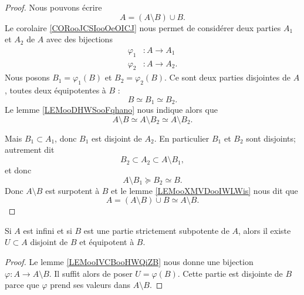 \begin{proof}
    Nous pouvons écrire
    \begin{equation}
        A=(A\setminus B)\cup B.
    \end{equation}
    Le corolaire \ref{CORooJCSIooOeOICJ} nous permet de considérer deux parties \( A_1\) et \( A_2\) de \( A\) avec des bijections
    \begin{subequations}
        \begin{align}
            \varphi_1&\colon A\to A_1\\
            \varphi_2&\colon A\to A_2.
        \end{align}
    \end{subequations}
    Nous posons \( B_1=\varphi_1(B)\) et \( B_2=\varphi_2(B)\). Ce sont deux parties disjointes de \( A\), toutes deux équipotentes à \( B\) :
    \begin{equation}
        B\simeq B_1\simeq B_2.
    \end{equation}
    Le lemme \ref{LEMooDHWSooFqhano} nous indique alors que
    \begin{equation}
        A\setminus B\simeq A\setminus B_2\simeq A\setminus B_2.
    \end{equation}
    
    Mais \( B_1\subset A_1\), donc \( B_1\) est disjoint de \( A_2\). En particulier \( B_1\) et \( B_2\) sont disjoints; autrement dit
    \begin{equation}
        B_2\subset A_2\subset A\setminus B_1,
    \end{equation}
    et donc
    \begin{equation}
         A\setminus B_1\succeq B_2\simeq B.
    \end{equation}
    Donc \( A\setminus B\) est surpotent à \( B\) et le lemme \ref{LEMooXMVDooIWLWis} nous dit que
    \begin{equation}
        A=(A\setminus B)\cup B\simeq A\setminus B.
    \end{equation}
\end{proof}

\begin{lemma}        \label{LEMooMRVQooUZSSyL}
    Si \( A\) est infini et si \( B\) est une partie strictement subpotente de \( A\), alors il existe \( U\subset A\) disjoint de \( B\) et équipotent à \( B\).
\end{lemma}

\begin{proof}
    Le lemme \ref{LEMooIVCBooHWQiZB} nous donne une bijection \( \varphi\colon A\to A\setminus B\). Il suffit alors de poser \( U=\varphi(B)\). Cette partie est disjointe de \( B\) parce que \( \varphi\) prend ses valeurs dans \( A\setminus B\).
\end{proof}

